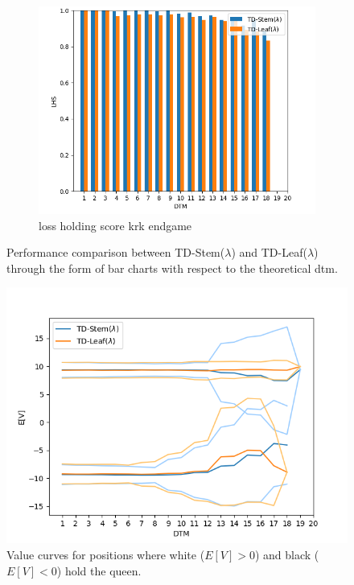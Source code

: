 \begin{figure}
\begin{subfigure}[]{0.4\textwidth}
\includegraphics[scale=0.45]{fig/plots/kqk_lhs}
\caption{loss holding score \gls{krk} endgame}
\end{subfigure}
\caption[Performance comparison between TD-Stem($\lambda$) and TD-Leaf($\lambda$)]{Performance comparison between TD-Stem($\lambda$) and TD-Leaf($\lambda$) through the form of bar charts with respect to the theoretical \gls{dtm}.}
\label{fig:kqk_perf}
\end{figure}

\begin{figure}
\centering
\includegraphics[]{fig/plots/kqk_vf}
\caption[Value curves experiment 2]{Value curves for positions where white ($E[V]>0$) and black ($E[V]<0$) hold the queen.}
\label{fig:kqk_vf}
\end{figure}

